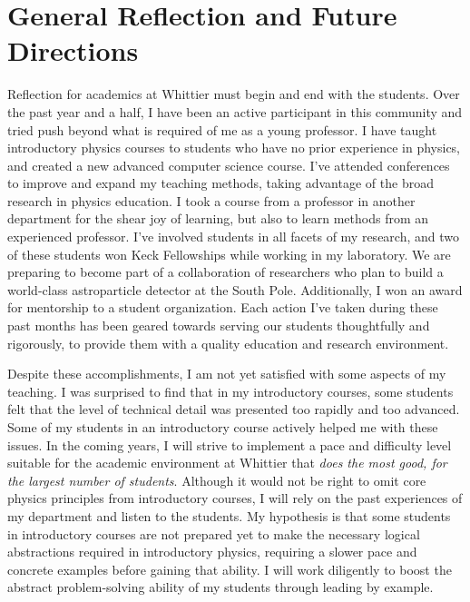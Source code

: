 \documentclass[../../main.tex]{subfiles}
\begin{document}
\section{General Reflection and Future Directions}

Reflection for academics at Whittier must begin and end with the students.  Over the past year and a half, I have been an active participant in this community and tried push beyond what is required of me as a young professor.  I have taught introductory physics courses to students who have no prior experience in physics, and created a new advanced computer science course.  I've attended conferences to improve and expand my teaching methods, taking advantage of the broad research in physics education.  I took a course from a professor in another department for the shear joy of learning, but also to learn methods from an experienced professor.  I've involved students in all facets of my research, and two of these students won Keck Fellowships while working in my laboratory.  We are preparing to become part of a collaboration of researchers who plan to build a world-class astroparticle detector at the South Pole.  Additionally, I won an award for mentorship to a student organization.  Each action I've taken during these past months has been geared towards serving our students thoughtfully and rigorously, to provide them with a quality education and research environment. \\ \hspace{0.1cm}

Despite these accomplishments, I am not yet satisfied with some aspects of my teaching.  I was surprised to find that in my introductory courses, some students felt that the level of technical detail was presented too rapidly and too advanced.  Some of my students in an introductory course actively helped me with these issues.  In the coming years, I will strive to implement a pace and difficulty level suitable for the academic environment at Whittier that \textit{does the most good, for the largest number of students}.  Although it would not be right to omit core physics principles from introductory courses, I will rely on the past experiences of my department and listen to the students.  My hypothesis is that some students in introductory courses are not prepared yet to make the necessary logical abstractions required in introductory physics, requiring a slower pace and concrete examples before gaining that ability.  I will work diligently to boost the abstract problem-solving ability of my students through leading by example.
\end{document}
